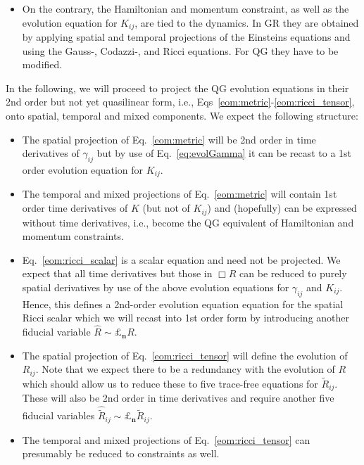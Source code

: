 \documentclass[a4paper,oneside,openany,11pt]{memoir}
\numberwithin{equation}{section} %
\begin{document}
{\begin{itemize}
	The evolution equation for $\gamma_{ij}$, i.e.,
	\begin{align}
	\label{eq:evolGamma}
		\partial_\bot \gamma_{ij}\equiv \pounds_t\gamma_{ij} - \pounds_\beta \gamma_{ij} = -2\alpha K_{ij}\;,
	\end{align}		
	is a definition and therefore independent of GR as well.
	\item
	On the contrary, the Hamiltonian and momentum constraint, as well as the evolution equation for $K_{ij}$, are tied to the dynamics. In GR they are obtained by applying spatial and temporal projections of the Einsteins equations and using the Gauss-, Codazzi-, and Ricci equations. For QG they have to be modified.
\end{itemize}
In the following, we will proceed to project the QG evolution equations in their 2nd order but not yet quasilinear form, i.e., Eqs~\eqref{eom:metric}-\eqref{eom:ricci_tensor}, onto spatial, temporal and mixed components. We expect the following structure:
\begin{itemize}
	\item 
	The spatial projection of Eq.~\eqref{eom:metric} will be 2nd order in time derivatives of $\gamma_{ij}$ but by use of Eq.~\eqref{eq:evolGamma} it can be recast to a 1st order evolution equation for $K_{ij}$.
	\item
	The temporal and mixed projections of Eq.~\eqref{eom:metric} will contain 1st order time derivatives of $K$ (but not of $K_{ij}$) and (hopefully) can be expressed without time derivatives, i.e., become the QG equivalent of Hamiltonian and momentum constraints.
	\item
	Eq.~\eqref{eom:ricci_scalar} is a scalar equation and need not be projected. We expect that all time derivatives but those in $\Box R$ can be reduced to purely spatial derivatives by use of the above evolution equations for $\gamma_{ij}$ and $K_{ij}$. Hence, this defines a 2nd-order evolution equation equation for the spatial Ricci scalar which we will recast into 1st order form by introducing another fiducial variable $\hat{R}\sim\pounds_\mathbf{n}R$.
	\item
	The spatial projection of Eq.~\eqref{eom:ricci_tensor} will define the evolution of $R_{ij}$. Note that we expect there to be a redundancy with the evolution of $R$ which should allow us to reduce these to five trace-free equations for $\tilde{R}_{ij}$. These will also be 2nd order in time derivatives and require another five fiducial variables $\hat{\tilde{R}}_{ij}\sim\pounds_\mathbf{n}\tilde{R}_{ij}$.
	\item
	The temporal and mixed projections of Eq.~\eqref{eom:ricci_tensor} can presumably be reduced to constraints as well.
\end{itemize} 

}
\end{document}
